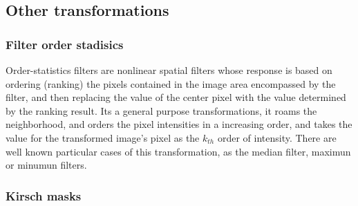 \documentclass[a4paper]{article}
\begin{document}
\subsection{Other transformations}
\subsubsection{Filter order stadisics}

Order-statistics filters are nonlinear spatial filters whose response is based on ordering (ranking) the pixels contained in the image area encompassed by
the filter, and then replacing the value of the center pixel with the value determined by the ranking result.
Its a general purpose transformations, it roams the neighborhood, and orders the pixel intensities in a increasing order, and takes the value for the transformed image's pixel as the $k_{th}$ order of intensity.
There are well known particular cases of this transformation, as the median filter, maximun or minumun filters.

\subsubsection{Kirsch masks}
\end{document}
